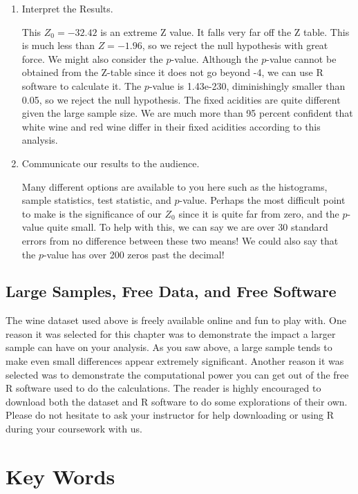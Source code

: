 \documentclass[11pt, chapterprefix=true]{scrbook}\usepackage[]{graphicx}\usepackage[]{color}
\begin{document}
\begin{enumerate}
\item Interpret the Results.

This $Z_0 = -32.42$ is an extreme Z value.  It falls very far off the Z table.  This is much less than $Z = -1.96$, so we reject the null hypothesis with great force.  We might also consider the $p$-value. Although the $p$-value cannot be obtained from the Z-table since it does not go beyond -4, we can use R software to calculate it. The $p$-value is 1.43e-230, diminishingly smaller than 0.05, so we reject the null hypothesis. The fixed acidities are quite different given the large sample size. We are much more than 95 percent confident that white wine and red wine differ in their fixed acidities according to this analysis.

\item Communicate our results to the audience.

Many different options are available to you here such as the histograms, sample statistics, test statistic, and $p$-value.  Perhaps the most difficult point to make is the significance of our $Z_0$ since it is quite far from zero, and the $p$-value quite small. To help with this, we can say we are over 30 standard errors from no difference between these two means! We could also say that the $p$-value has over 200 zeros past the decimal!

\end{enumerate}

\subsection{Large Samples, Free Data, and Free Software }

The wine dataset used above is freely available online and fun to play with. One reason it was selected for this chapter was to demonstrate the impact a larger sample can have on your analysis. As you saw above, a large sample tends to make even small differences appear extremely significant. Another reason it was selected was to demonstrate the computational power you can get out of the free R software used to do the calculations. The reader is highly encouraged to download both the dataset and R software to do some explorations of their own. Please do not hesitate to ask your instructor for help downloading or using R during your coursework with us.

\section{Key Words}
\end{document}
